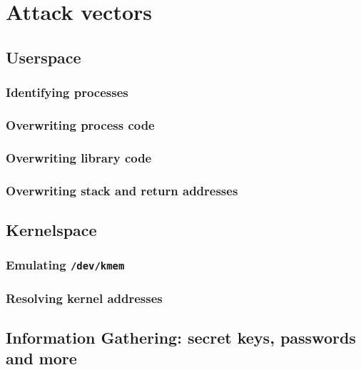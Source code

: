 %
%

\section{Attack vectors}



\subsection{Userspace}

\subsubsection{Identifying processes}

\subsubsection{Overwriting process code}

\subsubsection{Overwriting library code}

\subsubsection{Overwriting stack and return addresses}



\subsection{Kernelspace}

\subsubsection{Emulating \texttt{/dev/kmem}}

\subsubsection{Resolving kernel addresses}



\subsection{Information Gathering: secret keys, passwords and more}

